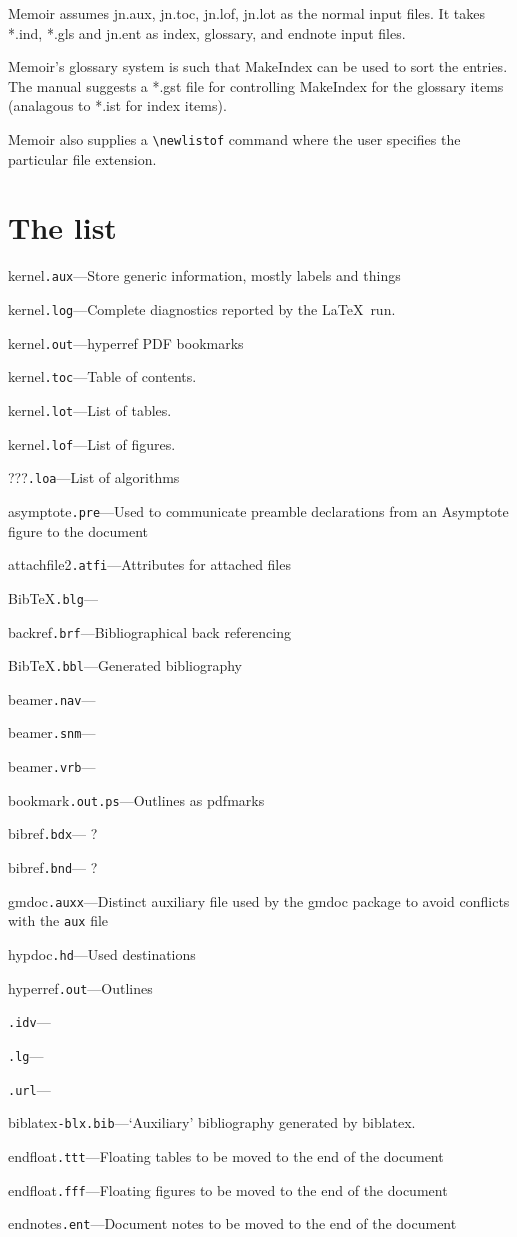 \documentclass{article}
\newcommand\ext[1]{\texttt{#1}}
\newcommand\pkg[1]{\textsf{#1}}
\newcommand\EXT[3]{\noindent #1\quad\ext{#2}\quad---\quad#3\par}
\begin{document}
Memoir assumes jn.aux, jn.toc, jn.lof, jn.lot as the normal input files. It takes *.ind, *.gls and jn.ent as index, glossary, and endnote input files.

Memoir's glossary system is such that MakeIndex can be used to sort the entries. The manual suggests a *.gst file for controlling MakeIndex for the glossary items (analagous to *.ist for index items).

Memoir also supplies a \verb|\newlistof| command where the user specifies the particular file extension.


\section{The list}

\EXT{kernel}{.aux}{Store generic information, mostly labels and things}
\EXT{kernel}{.log}{Complete diagnostics reported by the \LaTeX\ run.}
\EXT{kernel}{.out}{\pkg{hyperref} PDF bookmarks}
\EXT{kernel}{.toc}{Table of contents.}
\EXT{kernel}{.lot}{List of tables.}
\EXT{kernel}{.lof}{List of figures.}

\EXT{???}{.loa}{List of algorithms}

\EXT{asymptote}{.pre}{Used to communicate preamble declarations from an \pkg{Asymptote} figure to the document}

\EXT{attachfile2}{.atfi}{Attributes for attached files}

\EXT{Bib\TeX}{.blg}{}
\EXT{backref}{.brf}{Bibliographical back referencing}
\EXT{Bib\TeX}{.bbl}{Generated bibliography}

\EXT{beamer}{.nav}{}
\EXT{beamer}{.snm}{}
\EXT{beamer}{.vrb}{}

\EXT{bookmark}{.out.ps}{Outlines as pdfmarks}

\EXT{bibref}{.bdx}{ ?}
\EXT{bibref}{.bnd}{ ?}

\EXT{gmdoc}{.auxx}{Distinct auxiliary file used by the \pkg{gmdoc} package to avoid conflicts with the \ext{aux} file}

\EXT{hypdoc}{.hd}{Used destinations}

\EXT{hyperref}{.out}{Outlines}

\EXT{}{.idv}{}
\EXT{}{.lg}{}

\EXT{}{.url}{}

\EXT{biblatex}{-blx.bib}{`Auxiliary' bibliography generated by \pkg{biblatex}.}

\EXT{endfloat}{.ttt}{Floating tables to be moved to the end of the document}
\EXT{endfloat}{.fff}{Floating figures to be moved to the end of the document}
\EXT{endnotes}{.ent}{Document notes to be moved to the end of the document}
\end{document}
